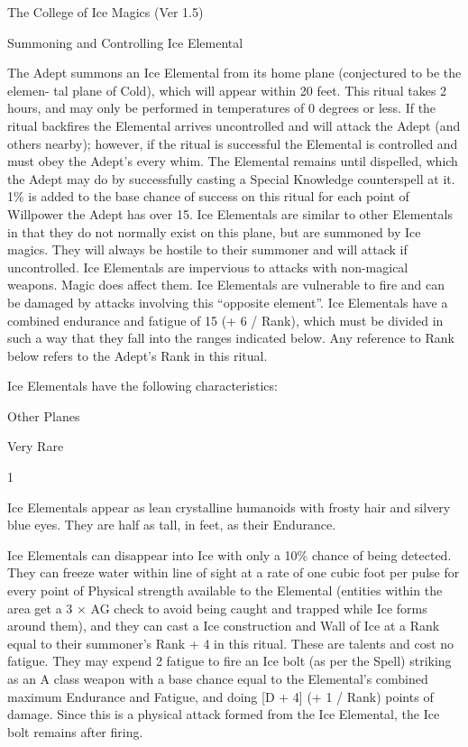 \begin{Chapter}{The College of Ice Magics (Ver 1.5)}
\begin{ritual}[R-2]{Summoning and Controlling Ice Elemental}
\begin{effects}
The Adept summons an Ice Elemental from its home plane (conjectured to
be the elemen- tal plane of Cold), which will appear within 20 feet.
This ritual takes 2 hours, and may only be performed in temperatures
of 0 degrees or less.  If the ritual backfires the Elemental arrives
uncontrolled and will attack the Adept (and others nearby); however,
if the ritual is successful the Elemental is controlled and must obey
the Adept’s every whim.  The Elemental remains until dispelled, which
the Adept may do by successfully casting a Special Knowledge
counterspell at it. 1\% is added to the base chance of success on this
ritual for each point of Willpower the Adept has over 15.  Ice
Elementals are similar to other Elementals in that they do not
normally exist on this plane, but are summoned by Ice magics. They
will always be hostile to their summoner and will attack if
uncontrolled.  Ice Elementals are impervious to attacks with
non-magical weapons.  Magic does affect them. Ice Elementals are
vulnerable to fire and can be damaged by attacks involving this
“opposite element”.  Ice Elementals have a combined endurance and
fatigue of 15 (+ 6 / Rank), which must be divided in such a way that
they fall into the ranges indicated below.  Any reference to Rank
below refers to the Adept’s Rank in this ritual.

Ice Elementals have the following characteristics: 
\begin{Description}
\item[Habitat] Other Planes  

\item[Frequency] Very Rare  

\item[Number] 1 

\item[Description] Ice Elementals appear as lean crystalline humanoids
  with frosty hair and silvery blue eyes.  They are half as tall, in
  feet, as their Endurance.

\item[Talents, Skills and Magic] Ice Elementals can disappear into Ice
  with only a 10\% chance of being detected. They can freeze water
  within line of sight at a rate of one cubic foot per pulse for every
  point of Physical strength available to the Elemental (entities
  within the area get a 3 × AG check to avoid being caught and trapped
  while Ice forms around them), and they can cast a Ice construction
  and Wall of Ice at a Rank equal to their summoner’s Rank + 4 in this
  ritual.  These are talents and cost no fatigue. They may expend 2
  fatigue to fire an Ice bolt (as per the Spell) striking as an A
  class weapon with a base chance equal to the Elemental’s combined
  maximum Endurance and Fatigue, and doing [D + 4] (+ 1 / Rank) points
  of damage.  Since this is a physical attack formed from the Ice
  Elemental, the Ice bolt remains after firing.


\end{Description}
\end{effects}
\end{ritual}
\end{Chapter}
